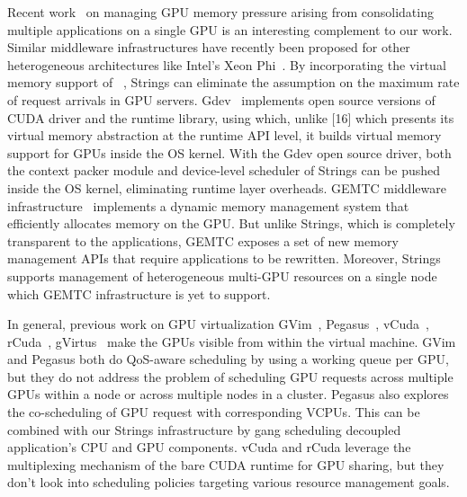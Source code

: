 Recent work~\cite{becchi} on managing GPU memory pressure arising from consolidating multiple applications on a single GPU is an interesting complement to our work. Similar middleware infrastructures have recently been proposed for other heterogeneous architectures like Intel’s Xeon Phi~\cite{phi}. By incorporating the virtual memory support of ~\cite{phi, becchi}, Strings can eliminate the assumption on the maximum rate of request arrivals in GPU servers. Gdev~\cite{gdev} implements open source versions of CUDA driver and the runtime library, using which, unlike [16] which presents its virtual memory abstraction at the runtime API level, it builds virtual memory support for GPUs inside the OS kernel. With the Gdev open source driver, both the context packer module and device-level scheduler of Strings can be pushed inside the OS kernel, eliminating runtime layer overheads. GEMTC middleware infrastructure~\cite{GPU43} implements a dynamic memory management system that efficiently allocates memory on the GPU. But unlike Strings, which is completely transparent to the applications, GEMTC exposes a set of new memory management APIs that require applications to be rewritten. Moreover, Strings supports management of heterogeneous multi-GPU resources on a single node which GEMTC infrastructure is yet to support.

In general, previous work on GPU virtualization GVim~\cite{gvim}, Pegasus~\cite{pegasus}, vCuda~\cite{vcuda}, rCuda~\cite{rcuda}, gVirtus~\cite{gvirtus} make the GPUs visible from within the virtual machine. GVim and Pegasus both do QoS-aware scheduling by using a working queue per GPU, but they do not address the problem of scheduling GPU requests across multiple GPUs within a node or across multiple nodes in a cluster. Pegasus also explores the co-scheduling of GPU request with corresponding VCPUs. This can be combined with our Strings infrastructure by gang scheduling decoupled application's CPU and GPU components. vCuda and rCuda leverage the multiplexing mechanism of the bare CUDA runtime for GPU sharing, but they don't look into scheduling policies targeting various resource management goals. 


